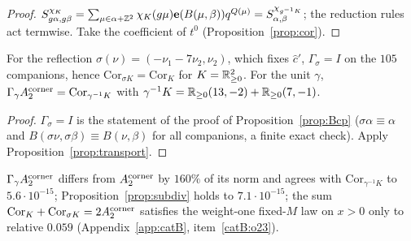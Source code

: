 \begin{proof}
$S^{\chi_K}_{g\alpha,g\beta}=\sum_{\mu\in\alpha+\mathbb{Z}^2}\chi_K(g\mu)\mathbf{e}(B(\mu,\beta))q^{Q(\mu)}=S^{\chi_{g^{-1}K}}_{\alpha,\beta}$; the reduction rules act termwise. Take the coefficient of $t^0$
(Proposition~\ref{prop:cor}).
\end{proof}
\begin{corollary}\label{cor:sigma}
For the reflection $\sigma(\nu)=(-\nu_1-7\nu_2,\nu_2)$, which fixes $\hat c'$, $\Gamma_\sigma=I$ on the $105$ companions, hence $\mathrm{Cor}_{\sigma K}=\mathrm{Cor}_K$ for $K=\mathbb{R}_{\ge0}^2$. For the unit
$\gamma$, $\Gamma_\gamma A_2^{\rm corner}=\mathrm{Cor}_{\gamma^{-1}K}$ with $\gamma^{-1}K=\mathbb{R}_{\ge0}(13,-2)+\mathbb{R}_{\ge0}(7,-1)$.
\end{corollary}
\begin{proof}
$\Gamma_\sigma=I$ is the statement of the proof of Proposition~\ref{prop:Bcp} ($\sigma\alpha\equiv\alpha$ and $B(\sigma\nu,\sigma\beta)\equiv B(\nu,\beta)$ for all companions, a finite exact check).
Apply Proposition~\ref{prop:transport}.
\end{proof}
\begin{catbremark}
$\Gamma_\gamma A_2^{\rm corner}$ differs from $A_2^{\rm corner}$ by $160\%$ of its norm and agrees with $\mathrm{Cor}_{\gamma^{-1}K}$ to $5.6\cdot10^{-15}$; Proposition~\ref{prop:subdiv} holds to
$7.1\cdot10^{-15}$; the sum $\mathrm{Cor}_K+\mathrm{Cor}_{\sigma K}=2A_2^{\rm corner}$ satisfies the weight-one fixed-$M$ law on $x>0$ only to relative $0.059$ (Appendix~\ref{app:catB},
item~\ref{catB:o23}).
\end{catbremark}
